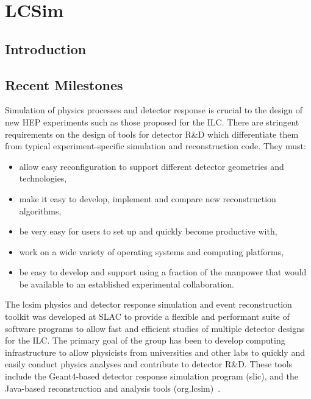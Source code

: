 \section{LCSim}
%

\subsection{Introduction}
\subsection{Recent Milestones}
Simulation of physics processes and detector response is crucial to the design
of new HEP experiments such as those proposed for the ILC. There are stringent
requirements on the design of tools for detector R\&D which differentiate them
from typical experiment-specific simulation and reconstruction code. They must:
\begin{itemize}
\item allow easy reconfiguration to support different detector geometries and technologies,
\item make it easy to develop, implement and compare new reconstruction algorithms,
\item be very easy for users to set up and quickly become productive with,
\item work on a wide variety of operating systems and computing platforms,
\item be easy to develop and support using a fraction of the manpower that would be available to an established experimental collaboration.
\end{itemize}
The lcsim physics and detector response simulation and event reconstruction
toolkit was developed at SLAC to provide a flexible and performant suite of
software programs to allow fast and efficient studies of multiple detector
designs for the ILC. The primary goal of the group has been to develop computing
infrastructure to allow physicists from universities and other labs to quickly
and easily conduct physics analyses and contribute to detector R\&D. These tools
include the Geant4-based detector response simulation program (slic), and the
Java-based reconstruction and analysis tools (org.lcsim)~\cite{lcsimWebpage}.

